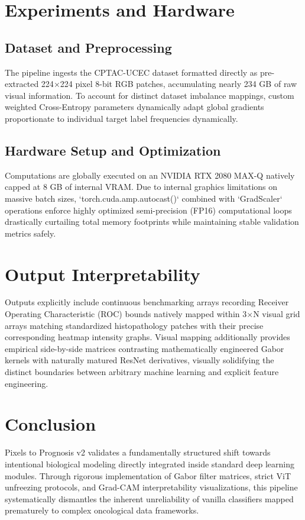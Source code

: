 \documentclass[conference]{IEEEtran}
\begin{document}
\section{Experiments and Hardware}

\subsection{Dataset and Preprocessing}
The pipeline ingests the CPTAC-UCEC dataset formatted directly as pre-extracted 224$\times$224 pixel 8-bit RGB patches, accumulating nearly 234 GB of raw visual information. To account for distinct dataset imbalance mappings, custom weighted Cross-Entropy parameters dynamically adapt global gradients proportionate to individual target label frequencies dynamically. 

\subsection{Hardware Setup and Optimization}
Computations are globally executed on an NVIDIA RTX 2080 MAX-Q natively capped at 8 GB of internal VRAM. Due to internal graphics limitations on massive batch sizes, `torch.cuda.amp.autocast()` combined with `GradScaler` operations enforce highly optimized semi-precision (FP16) computational loops drastically curtailing total memory footprints while maintaining stable validation metrics safely.

\section{Output Interpretability}
Outputs explicitly include continuous benchmarking arrays recording Receiver Operating Characteristic (ROC) bounds natively mapped within 3$\times$N visual grid arrays matching standardized histopathology patches with their precise corresponding heatmap intensity graphs. Visual mapping additionally provides empirical side-by-side matrices contrasting mathematically engineered Gabor kernels with naturally matured ResNet derivatives, visually solidifying the distinct boundaries between arbitrary machine learning and explicit feature engineering. 

\section{Conclusion}
Pixels to Prognosis v2 validates a fundamentally structured shift towards intentional biological modeling directly integrated inside standard deep learning modules. Through rigorous implementation of Gabor filter matrices, strict ViT unfreezing protocols, and Grad-CAM interpretability visualizations, this pipeline systematically dismantles the inherent unreliability of vanilla classifiers mapped prematurely to complex oncological data frameworks.
\end{document}
